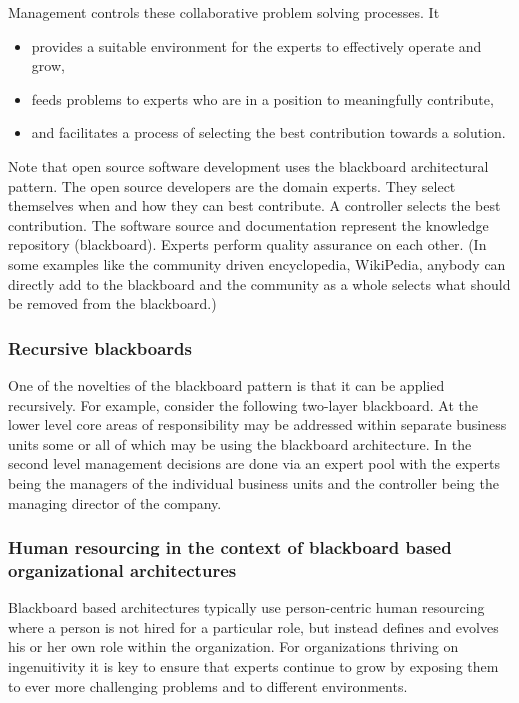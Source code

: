 \documentclass[11pt,english,a4]{article}
\begin{document}
Management controls these collaborative problem solving processes. It 
\begin{itemize}
  \item provides a suitable environment for the experts to effectively operate and grow,
  \item feeds problems to experts who are in a position to meaningfully contribute,
  \item and facilitates a process of selecting the best contribution towards a solution.
\end{itemize}
\noindent  
Note that open source software development uses the blackboard architectural pattern. The open source developers are the domain experts. They select themselves when and how they can best contribute. A controller selects the best contribution. The software source and documentation represent the knowledge repository (blackboard). Experts perform quality assurance on each other. (In some examples like the community driven encyclopedia, WikiPedia, anybody can directly add to the blackboard and the community as a whole selects what should be removed from the blackboard.)

\subsubsection{Recursive blackboards}

One of the novelties of the blackboard pattern is that it can be applied recursively. For example, consider the following two-layer blackboard. At the lower level core areas of responsibility may be addressed within separate business units some or all of which may be using the blackboard architecture. In the second level management decisions are done via an expert pool with the experts being the managers of the individual business units and the controller being the managing director of the company.

\subsubsection{Human resourcing in the context of blackboard based organizational architectures}

Blackboard based architectures typically use person-centric human resourcing where a person is not hired for a particular role, but instead defines and evolves his or her own role within the organization. For organizations thriving on ingenuitivity it is key to ensure that experts continue to grow by exposing them to ever more challenging problems and to different environments.
\end{document}

